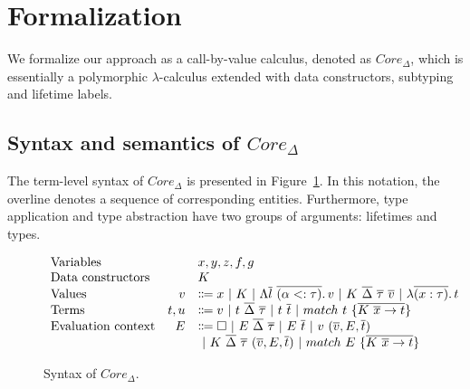 \documentclass[11pt]{article}
\newcommand{\vor}{~|~}
\newcommand{\ap}{~}
\begin{document}
    \section{Formalization} \label{sec:formalization}

    We formalize our approach as a call-by-value calculus, denoted as $Core_{\Delta}$, which is essentially a polymorphic $\lambda$-calculus extended with data constructors, subtyping and lifetime labels.

    \subsection{Syntax and semantics of $Core_\Delta$}

    The term-level syntax of $Core_\Delta$ is presented in Figure~\ref{fig:core-syntax}.
    In this notation, the overline denotes a sequence of corresponding entities.
    Furthermore, type application and type abstraction have two groups of arguments: lifetimes and types.

    \begin{figure}
        \centering
        \[
            \begin{array}{lrl}
                \text{Variables}          &   & x, y, z, f, g                                                                                                                          \\
                \text{Data constructors}  &   & K                                                                                                                                      \\
                \text{Values} & v & \Coloneqq x \vor K \vor \Lambda \overline{l}~\overline{(\alpha <: \tau)} \ldotp v \vor K\ap\overline{\Delta}\ap \overline{\tau} \ap \overline{v} \vor \lambda \overline{(x : \tau)}\ldotp t
                \\
                \text{Terms} & t, u & \Coloneqq v \vor t\ap\overline{\Delta}\ap\overline{\tau} \vor t\ap \overline{t} \vor match ~ t ~\{\overline{K \ap \overline{x} \to t}\}
                \\
                \text{Evaluation context} & E & \Coloneqq \square \vor E \ap\overline{\Delta}\ap \overline{\tau} \vor E \ap \overline{t} \vor v \ap (\overline{v}, E, \overline{t})    \\
                &   & \vor K\ap\overline{\Delta}\ap\overline{\tau}\ap(\overline{v}, E, \overline{t}) \vor match\ap E\ap \{\overline{K\ap\overline{x}\to t}\}
            \end{array}
        \]
        \caption{Syntax of $Core_\Delta$.}
        \label{fig:core-syntax}
    \end{figure}
\end{document}

